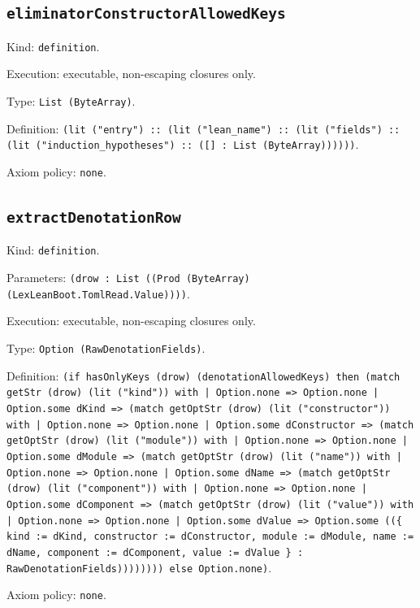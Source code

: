 \documentclass[11pt]{article}
\begin{document}
\subsection*{\texttt{eliminatorConstructorAllowedKeys}}
\noindent Kind: \texttt{definition}.\par
\noindent Execution: executable, non-escaping closures only.\par
\noindent Type: \texttt{List (ByteArray)}.\par
\noindent Definition: \texttt{(lit ("entry") :: (lit ("lean\_name") :: (lit ("fields") :: (lit ("induction\_hypotheses") :: ([] : List (ByteArray))))))}.\par
\noindent Axiom policy: \texttt{none}.\par
\subsection*{\texttt{extractDenotationRow}}
\noindent Kind: \texttt{definition}.\par
\noindent Parameters: \texttt{(drow : List ((Prod (ByteArray) (LexLeanBoot.TomlRead.Value))))}.\par
\noindent Execution: executable, non-escaping closures only.\par
\noindent Type: \texttt{Option (RawDenotationFields)}.\par
\noindent Definition: \texttt{(if hasOnlyKeys (drow) (denotationAllowedKeys) then (match getStr (drow) (lit ("kind")) with | Option.none => Option.none | Option.some dKind => (match getOptStr (drow) (lit ("constructor")) with | Option.none => Option.none | Option.some dConstructor => (match getOptStr (drow) (lit ("module")) with | Option.none => Option.none | Option.some dModule => (match getOptStr (drow) (lit ("name")) with | Option.none => Option.none | Option.some dName => (match getOptStr (drow) (lit ("component")) with | Option.none => Option.none | Option.some dComponent => (match getOptStr (drow) (lit ("value")) with | Option.none => Option.none | Option.some dValue => Option.some ((\{ kind := dKind, constructor := dConstructor, module := dModule, name := dName, component := dComponent, value := dValue \} : RawDenotationFields)))))))) else Option.none)}.\par
\noindent Axiom policy: \texttt{none}.\par
\end{document}
